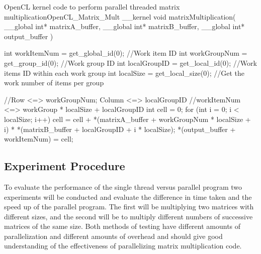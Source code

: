\begin{OpenCL}{OpenCL kernel code to perform parallel threaded matrix multiplication}{OpenCL_Matrix_Mult}
 __kernel void matrixMultiplication(
  __global int* matrixA_buffer,
  __global int* matrixB_buffer,
  __global int* output_buffer
 ){
  int workItemNum = get_global_id(0); //Work item ID
  int workGroupNum = get_group_id(0); //Work group ID
  int localGroupID = get_local_id(0); //Work items ID within each work group
  int localSize = get_local_size(0); //Get the work number of items per group

  //Row <=> workGroupNum; Column <=> localGroupID
  //workItemNum <=> workGroup * localSize + localGroupID
  int cell = 0;
  for (int i = 0; i < localSize; i++) {
   cell = cell + *(matrixA_buffer + workGroupNum * localSize + i) *
    *(matrixB_buffer + localGroupID + i * localSize);
  }
  *(output_buffer + workItemNum) = cell;
 }
\end{OpenCL}

\subsection{Experiment Procedure}

To evaluate the performance of the single thread versus parallel program two experiments will be conducted and evaluate the difference in time taken and the speed up of the parallel program.
The first will be multiplying two matrices with different sizes, and the second will be to multiply different numbers of successive matrices of the same size.
Both methods of testing have different amounts of parallelization and different amounts of overhead and should give good understanding of the effectiveness of parallelizing matrix multiplication code.